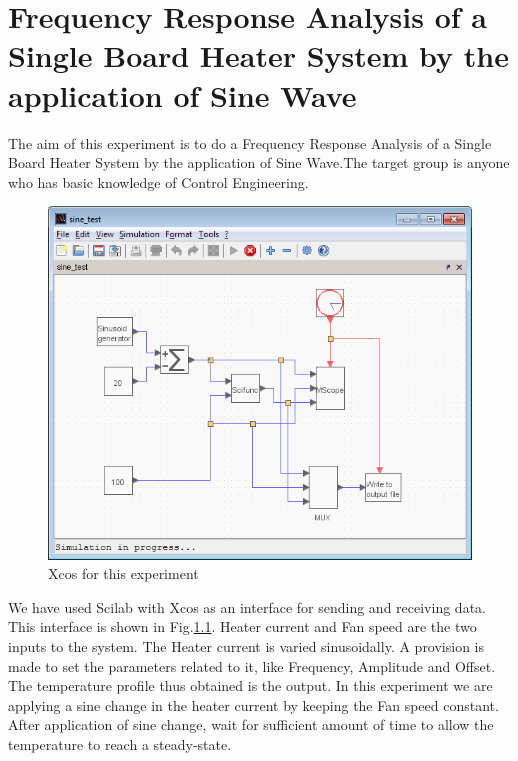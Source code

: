 \chapter{Frequency Response Analysis of a Single Board Heater System by the application of Sine Wave}
The aim of this experiment is to do a Frequency Response Analysis of a Single Board Heater System by the application of Sine Wave.The target group is anyone who has basic knowledge of Control Engineering.
\begin{figure}
\centering
\includegraphics[width=\linewidth]{sinetest_manual/sinetest_xcos.png}
\caption{Xcos for this experiment}
\label{xcos_sine}
\end{figure}
We have used Scilab with Xcos as an interface for sending and receiving data. This interface is shown in Fig.\ref{xcos_sine}. Heater current and Fan speed are the two inputs to the system. The Heater current is varied sinusoidally. A provision is made to set the parameters related to it, like Frequency, Amplitude and Offset. The temperature profile thus obtained is the output.
In this experiment we are applying a sine change in the heater current by keeping the Fan speed constant. After application of sine change, wait for sufficient amount of time to allow the temperature to reach a steady-state.
